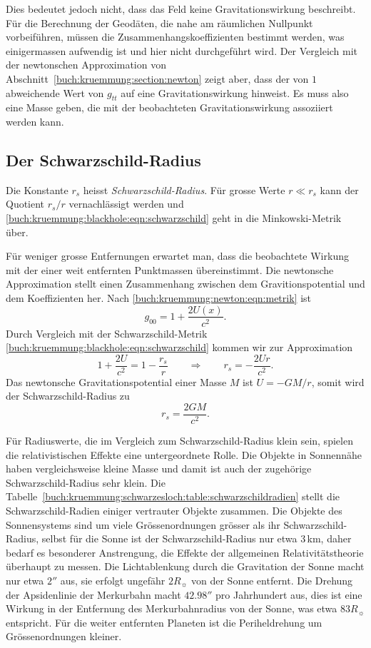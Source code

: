 Dies bedeutet jedoch nicht, dass das Feld keine Gravitationswirkung
beschreibt.
Für die Berechnung der Geodäten, die nahe am räumlichen
Nullpunkt vorbeiführen, müssen die Zusammenhangskoeffizienten
bestimmt werden, was einigermassen aufwendig ist und hier nicht
durchgeführt wird.
Der Vergleich mit der newtonschen Approximation von
Abschnitt~\ref{buch:kruemmung:section:newton}
zeigt aber, dass der von $1$ abweichende Wert von $g_{tt}$ auf
eine Gravitationswirkung hinweist.
Es muss also eine Masse geben, die mit der beobachteten Gravitationswirkung
assoziiert werden kann.

%
%
\subsection{Der Schwarzschild-Radius}
%
Die Konstante $r_s$ heisst \emph{Schwarzschild-Radius}.
%
Für grosse Werte $r\ll r_s$ kann der Quotient $r_s/r$ vernachlässigt
werden und \eqref{buch:kruemmung:blackhole:eqn:schwarzschild} geht
in die Minkowski-Metrik über.

Für weniger grosse Entfernungen erwartet man, dass die beobachtete
Wirkung mit der einer weit entfernten Punktmassen übereinstimmt.
Die newtonsche Approximation stellt einen Zusammenhang zwischen
dem Gravitionspotential und dem Koeffizienten her.
Nach \eqref{buch:kruemmung:newton:eqn:metrik} ist
\[
g_{00} = 1+\frac{2U(x)}{c^2}.
\]
Durch Vergleich mit der Schwarzschild-Metrik
\eqref{buch:kruemmung:blackhole:eqn:schwarzschild}
kommen wir zur Approximation
\[
1
+
\frac{2U}{c^2}
=
1
-
\frac{r_s}{r}
\qquad\Rightarrow\qquad
r_s
=
-
\frac{2Ur}{c^2}.
\]
Das newtonsche Gravitationspotential einer Masse $M$ ist $U=-GM/r$,
somit wird der Schwarzschild-Radius zu
\[
r_s
=
\frac{2GM}{c^2}.
\]

Für Radiuswerte, die im Vergleich zum Schwarzschild-Radius klein sein,
spielen die relativistischen Effekte eine untergeordnete Rolle.
Die Objekte in Sonnennähe haben vergleichsweise kleine Masse und damit
ist auch der zugehörige Schwarzschild-Radius sehr klein.
Die Tabelle~\ref{buch:kruemmung:schwarzesloch:table:schwarzschildradien}
stellt die Schwarzschild-Radien einiger vertrauter Objekte zusammen.
Die Objekte des Sonnensystems sind um viele Grössenordnungen grösser
als ihr Schwarzschild-Radius, selbst für die Sonne ist der
Schwarzschild-Radius nur etwa 3\,km, daher bedarf es besonderer 
Anstrengung, die Effekte der allgemeinen Relativitätstheorie überhaupt
zu messen.
Die Lichtablenkung durch die Gravitation der Sonne macht nur etwa
$2''$ aus, sie erfolgt ungefähr $2R_{\sun}$ von der Sonne entfernt.
Die Drehung der Apsidenlinie der Merkurbahn macht $42.98''$ pro
Jahrhundert aus, dies ist eine Wirkung in der Entfernung des
Merkurbahnradius von der Sonne, was etwa $83R_{\sun}$ entspricht.
Für die weiter entfernten Planeten ist die Periheldrehung um Grössenordnungen
kleiner.

